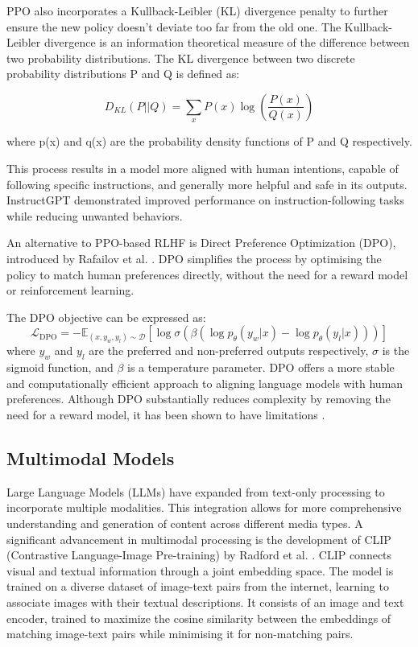 \documentclass[a4paper, oneside]{discothesis}
\begin{document}
PPO also incorporates a Kullback-Leibler (KL) divergence penalty to further ensure the new policy doesn't deviate too far from the old one. The Kullback-Leibler divergence is an information theoretical measure of the difference between two probability distributions. The KL divergence between two discrete probability distributions P and Q is defined as:

\[D_{KL}(P||Q) = \sum_{x} P(x) \log\left(\frac{P(x)}{Q(x)}\right)\]

where p(x) and q(x) are the probability density functions of P and Q respectively.

This process results in a model more aligned with human intentions, capable of following specific instructions, and generally more helpful and safe in its outputs. InstructGPT demonstrated improved performance on instruction-following tasks while reducing unwanted behaviors.

An alternative to PPO-based RLHF is Direct Preference Optimization (DPO), introduced by Rafailov et al. \cite{rafailov2023direct}. 
DPO simplifies the process by optimising the policy to match human preferences directly, without the need for a reward model or reinforcement learning. 

The DPO objective can be expressed as:
\[\mathcal{L}_{\text{DPO}} = -\mathbb{E}_{(x,y_w,y_l)\sim \mathcal{D}}[\log \sigma(\beta(\log p_\theta(y_w|x) - \log p_\theta(y_l|x)))]\]
where $y_w$ and $y_l$ are the preferred and non-preferred outputs respectively, $\sigma$ is the sigmoid function, and $\beta$ is a temperature parameter. DPO offers a more stable and computationally efficient approach to aligning language models with human preferences. Although DPO substantially reduces complexity by removing the need for a reward model, it has been shown to have limitations \cite{dposuperiortoppo_xu}.


\subsection{Multimodal Models}
Large Language Models (LLMs) have expanded from text-only processing to incorporate multiple modalities. This integration allows for more comprehensive understanding and generation of content across different media types. A significant advancement in multimodal processing is the development of CLIP (Contrastive Language-Image Pre-training) by Radford et al. \cite{radford2021cliplearning}. CLIP connects visual and textual information through a joint embedding space. The model is trained on a diverse dataset of image-text pairs from the internet, learning to associate images with their textual descriptions. It consists of an image and text encoder, trained to maximize the cosine similarity between the embeddings of matching image-text pairs while minimising it for non-matching pairs.
\end{document}
